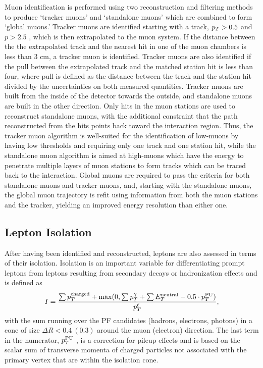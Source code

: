  Muon identification is performed using
  two reconstruction and filtering methods to produce 
  `tracker muons' and `standalone muons' which are 
  combined to form  `global muons.'
 Tracker muons are identified starting with
  a track, $p_T>0.5$ \GeV and $p>2.5$ \GeV,
  which is then extrapolated to the muon system.
 If the distance between the the extrapolated
  track and the nearest hit in one of the muon 
  chambers is less than 3 cm, a tracker muon
  is identified.
 Tracker muons are also identified if the 
  pull between the extrapolated track and the
  matched station hit is less than four, where
  pull is defined as the distance between
  the track and the station hit divided by 
  the uncertainties on both measured quantities.
 Tracker muons are built from the inside of the
  detector towards the outside, and 
  standalone muons are built in the other direction.
 Only hits in the muon stations are used to 
  reconstruct standalone muons, with the 
  additional constraint that the path reconstructed
  from the hits points back toward the 
  interaction region.
 Thus, the tracker muon algorithm is well-suited
  for the identification of low-\pt muons by having
  low thresholds and requiring only one track
  and one station hit, while the standalone
  muon algorithm is aimed at high-\pt muons
  which have the energy to penetrate multiple layers
  of muon stations to form tracks which can be
  traced back to the interaction.
 Global muons are required to pass the criteria for both 
  standalone muons and tracker muons, and,
  starting with the standalone muons, 
  the global muon trajectory is refit using information from both 
  the muon stations and the tracker,
  yielding an improved energy resolution than either one.

\subsection{Lepton Isolation}

After having been identified and reconstructed, 
 leptons are also assessed in terms of their
 isolation.
Isolation is an important variable for 
 differentiating prompt leptons from 
 leptons resulting from secondary decays or
 hadronization effects and is defined as
\begin{equation}
\label{eq:iso}
I =\frac{ \sum p_T^{\mathrm{charged}}+{\mathrm{max}}(0,\sum p_T^{\gamma}+\sum E_T^{\mathrm{neutral}}-0.5\cdot p_T^{\mathrm{PU}})}{p_T^\ell},
\end{equation}
 with the sum running over the PF candidates (hadrons, electrons, photons)
 in a cone of size $\Delta R < 0.4~(0.3)$ around the muon (electron) direction.
The last term in the numerator, $p_T^{\mathrm{PU}}$ ,
 is a correction for pileup effects
 and is based on the scalar sum of transverse momenta of charged particles
 not associated with the primary vertex that are within the isolation cone.

